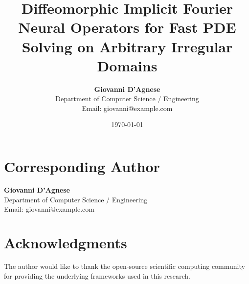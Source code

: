 \documentclass[12pt]{article}
\begin{document}
\title{\textbf{Diffeomorphic Implicit Fourier Neural Operators for Fast PDE Solving on Arbitrary Irregular Domains}}

\author{
    \textbf{Giovanni D'Agnese}\\
    Department of Computer Science / Engineering\\
    Email: giovanni@example.com
}

\date{\today}

\maketitle

\section*{Corresponding Author}
\textbf{Giovanni D'Agnese}\\
Department of Computer Science / Engineering\\
Email: giovanni@example.com

\section*{Acknowledgments}
The author would like to thank the open-source scientific computing community for providing the underlying frameworks used in this research.
\end{document}
